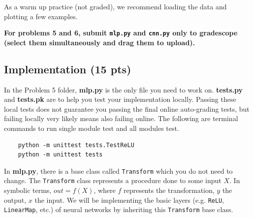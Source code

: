 


As a warm up practice (not graded), we recommend loading the data and plotting a few examples. 

\textbf{For problems 5 and 6, submit \texttt{mlp.py} and \texttt{cnn.py} only to gradescope (select them simultaneously and drag them to upload).}



\subsection{Implementation (15 pts)}

In the Problem 5 folder, \textbf{mlp.py} is the only file you need to work on. \textbf{tests.py} and \textbf{tests.pk} are to help you test your implementation locally. Passing these local tests does not guarantee you passing the final online auto-grading tests, but failing locally very likely means also failing online. The following are terminal commands to run single module test and all modules test. 
\begin{verbatim}
    python -m unittest tests.TestReLU
    python -m unittest tests
\end{verbatim}

In \textbf{mlp.py}, there is a base class called \texttt{Transform} which you do not need to change. The \texttt{Transform} class represents a procedure done to some input $X$. In symbolic terms, $out = f(X)$, where $f$ represents the transformation, $y$ the output, $x$ the input. We will be implementing the basic layers (e.g. \texttt{ReLU}, \texttt{LinearMap}, etc.) of neural networks by inheriting this \texttt{Transform} base class.



